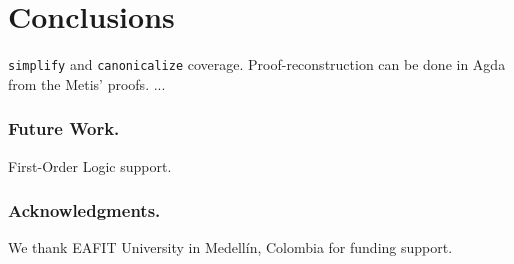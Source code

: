 \documentclass[runningheads,a4paper]{llncs}
\begin{document}
\section{Conclusions}
\label{secconclusion}
\verb!simplify! and \verb!canonicalize! coverage.
Proof-reconstruction can be done in Agda from the Metis' proofs.
...

\subsubsection*{Future Work.}
First-Order Logic support.

\subsubsection*{Acknowledgments.}
We thank EAFIT University in Medell\'in, Colombia for funding support.



\end{document}
